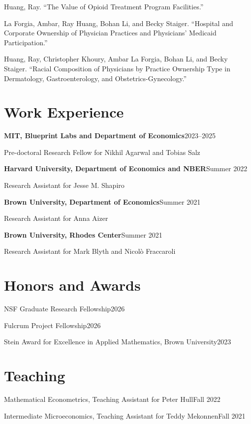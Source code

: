 \documentclass[11pt]{article}
\newcommand{\cvitem}[2]{\noindent\textbf{#1}\hfill #2\par}
\newcommand{\cvline}[2]{\noindent #1\hfill #2\par}
\begin{document}
Huang, Ray. ``The Value of Opioid Treatment Program Facilities.''

\smallskip

La Forgia, Ambar, Ray Huang, Bohan Li, and Becky Staiger.
``Hospital and Corporate Ownership of Physician Practices and Physicians' Medicaid Participation.''

\smallskip

Huang, Ray, Christopher Khoury, Ambar La Forgia, Bohan Li, and Becky Staiger.
``Racial Composition of Physicians by Practice Ownership Type in Dermatology, Gastroenterology, and Obstetrics-Gynecology.''

\section*{Work Experience}

\cvitem{MIT, Blueprint Labs and Department of Economics}{2023--2025}
Pre-doctoral Research Fellow for Nikhil Agarwal and Tobias Salz

\smallskip

\cvitem{Harvard University, Department of Economics and NBER}{Summer 2022}
Research Assistant for Jesse M. Shapiro

\smallskip

\cvitem{Brown University, Department of Economics}{Summer 2021}
Research Assistant for Anna Aizer

\smallskip

\cvitem{Brown University, Rhodes Center}{Summer 2021}
Research Assistant for Mark Blyth and Nicol\`o Fraccaroli

\section*{Honors and Awards}

\cvline{NSF Graduate Research Fellowship}{2026}

\cvline{Fulcrum Project Fellowship}{2026}

\cvline{Stein Award for Excellence in Applied Mathematics, Brown University}{2023}

\section*{Teaching}

\cvline{Mathematical Econometrics, Teaching Assistant for Peter Hull}{Fall 2022}

\cvline{Intermediate Microeconomics, Teaching Assistant for Teddy Mekonnen}{Fall 2021}
\end{document}
